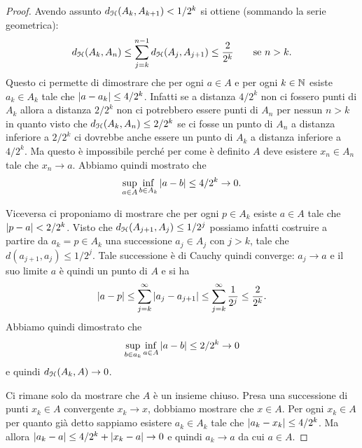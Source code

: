 \begin{proof}
Avendo assunto $d_\mathcal H(A_k, A_{k+1}) < 1/2^k$ si ottiene (sommando la serie geometrica):
\[
 d_\mathcal H(A_k, A_n) \le \sum_{j=k}^{n-1} d_\mathcal H(A_j, A_{j+1}) \le \frac{2}{2^k}\qquad \text{se $n>k$}.
\]
Questo ci permette di dimostrare che per ogni $a\in A$ e per ogni $k\in {\mathbb N}$ esiste $a_k \in A_k$ tale che
${\left|a - a_k\right|}\le 4/2^k$. Infatti se a distanza $4/2^k$ non ci fossero punti di $A_k$ allora a distanza $2/2^k$ non ci potrebbero essere punti di $A_n$ per nessun $n>k$ in quanto visto che $d_\mathcal H(A_k,A_n) \le 2/2^k$ se ci fosse un punto di $A_n$ a distanza inferiore a $2/2^k$ ci dovrebbe anche essere un punto di $A_k$ a distanza inferiore a $4/2^k$. Ma questo è impossibile perché per come è definito $A$ deve esistere $x_n \in A_n$ tale che $x_n \to a$. Abbiamo quindi mostrato che
\[
  \sup_{a\in A} \inf_{b\in A_k} {\left|a-b\right|} \le 4/2^k \to 0.
\]

Viceversa ci proponiamo di mostrare che per ogni $p \in A_k$ esiste $a \in A$ tale che ${\left|p-a\right|} < 2/2^k$.
Visto che $d_\mathcal H(A_{j+1},A_j) \le 1/2^j$
possiamo infatti costruire a partire da $a_k=p \in A_k$
una successione $a_j \in A_j$ con $j > k$, tale che $d(a_{j+1},a_j) \le 1/2^j$. Tale successione è di Cauchy
quindi converge: $a_j \to a$
e il suo limite $a$ è quindi un punto di $A$ e si ha
\[
  {\left|a-p\right|} \le \sum_{j=k}^\infty {\left|a_j - a_{j+1}\right|}
    \le \sum_{j=k}^\infty \frac{1}{2^j} \le \frac{2}{2^k}.
\]
Abbiamo quindi dimostrato che
\[
  \sup_{b\in a_k} \inf_{a\in A} {\left|a-b\right|} \le 2/2^k \to 0
\]
e quindi $d_\mathcal H(A_k,A)\to 0$.

Ci rimane solo da mostrare che $A$ è un insieme chiuso.
Presa una successione di punti $x_k\in A$ convergente $x_k\to x$, dobbiamo mostrare che $x\in A$. Per ogni $x_k\in A$ per quanto già detto sappiamo esistere $a_k \in A_k$ tale che ${\left|a_k-x_k\right|}\le 4/2^k$. Ma allora ${\left|a_k-a\right|} \le 4/2^k + {\left|x_k-a\right|} \to 0$ e quindi $a_k\to a$ da cui $a\in A$.
 \end{proof}

